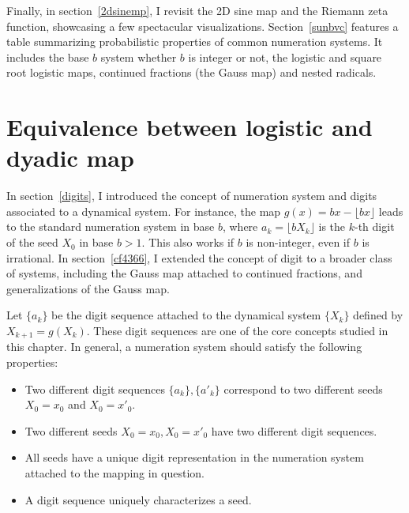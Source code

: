 \documentclass[oneside,10pt]{book}
\begin{document}
Finally, in 
section~\ref{2dsinemp}, I revisit the 2D sine map and the Riemann zeta function, showcasing a few spectacular visualizations. Section~\ref{sunbvc} features a table summarizing probabilistic properties of common numeration systems. It includes the base $b$ system whether $b$ is integer or not, the logistic and square root logistic maps, continued fractions (the Gauss map) and nested
 radicals.


\section{Equivalence between logistic and dyadic map}

In section~\ref{digits}, I introduced the concept of numeration system and digits associated to a dynamical system.
For instance, the map $g(x)=bx - \lfloor bx \rfloor$ leads to the standard numeration system in base $b$, where 
 $a_k=\lfloor bX_k\rfloor$ is the $k$-th digit of the seed $X_0$ in base $b>1$.  This also works if $b$ is non-integer, even if $b$ is irrational. 
In section~\ref{cf4366}, I extended the concept of \textcolor{index}{digit} to a broader class of systems, including the Gauss map attached to continued fractions, and generalizations of the Gauss map.

Let $\{a_k\}$ be the digit sequence attached to the dynamical system
$\{X_k\}$ defined by $X_{k+1}=g(X_k)$. 
These digit sequences are one of the core concepts studied in this chapter. 
In general, a numeration system should satisfy the following properties: \vspace{1ex}

\begin{itemize}
\item Two different digit sequences $\{a_k\}, \{a'_k\}$ correspond to two different seeds $X_0=x_0$ and $X_0=x'_0$.
\item Two different seeds $X_0=x_0,X_0=x'_0$ have two different digit sequences.
\item All seeds have a unique digit representation in the numeration system attached to the mapping in question.
\item A digit sequence uniquely characterizes a seed.
\end{itemize}\vspace{1ex}
\end{document}
